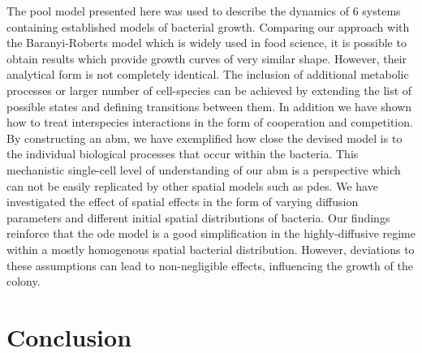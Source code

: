 \documentclass[10pt,A4paper]{article}
\numberwithin{equation}{section}
\begin{document}
The pool model presented here was used to describe the dynamics of 6 systems containing established models of bacterial growth.
Comparing our approach with the Baranyi-Roberts model which is widely used in food science, it is possible to obtain results which provide growth curves of very similar shape.
However, their analytical form is not completely identical.
The inclusion of additional metabolic processes or larger number of cell-species can be achieved by extending the list of possible states and defining transitions between them.
In addition we have shown how to treat interspecies interactions in the form of cooperation and competition.
By constructing an \ac{abm}, we have exemplified how close the devised model is to the individual biological processes that occur within the bacteria.
This mechanistic single-cell level of understanding of our \ac{abm} is a perspective which can not be easily replicated by other spatial models such as \acp{pde}.
We have investigated the effect of spatial effects in the form of varying diffusion parameters and different initial spatial distributions of bacteria.
Our findings reinforce that the \ac{ode} model is a good simplification in the highly-diffusive regime within a mostly homogenous spatial bacterial distribution.
However, deviations to these assumptions can lead to non-negligible effects, influencing the growth of the colony.

\section{Conclusion}
\end{document}
